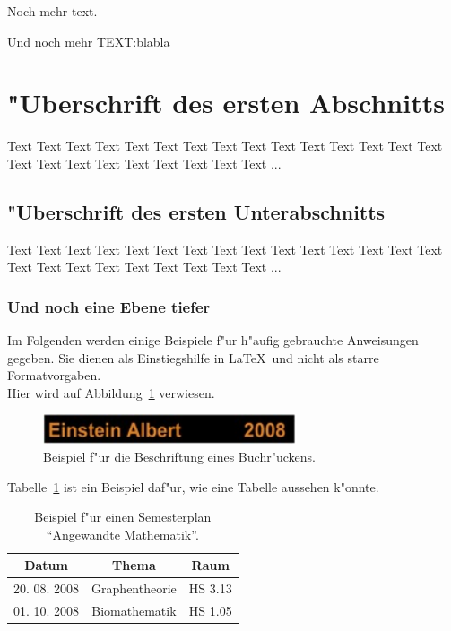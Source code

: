 \documentclass[a4paper,bibtotoc,oneside]{scrbook}
\begin{document}
Noch mehr text.

Und noch mehr TEXT:blabla

\section[Erster Abschnitt]{"Uberschrift des ersten Abschnitts}

Text Text Text Text Text Text Text Text Text Text Text Text Text Text Text Text Text Text Text Text Text Text Text Text ...

\subsection[Erster Unterabschnitt]{"Uberschrift des ersten Unterabschnitts}

Text Text Text Text Text Text Text Text Text Text Text Text Text Text Text Text Text Text Text Text Text Text Text Text ...

\subsubsection[Erster Unter-Unterabschnitt]{Und noch eine Ebene tiefer} 

Im Folgenden werden einige Beispiele f"ur h"aufig gebrauchte Anweisungen gegeben. Sie dienen als Einstiegshilfe in \LaTeX\ und 
nicht als starre Formatvorgaben.  
\\[2\baselineskip]
Hier wird auf Abbildung~\ref{Abb1} verwiesen. 
\begin{figure}[htbp]
\centering
\includegraphics[width=75mm]{Buchruecken}
\caption[Beschriftung eines Buchr"uckens.]{Beispiel f"ur die Beschriftung eines Buchr"uckens.}\label{Abb1}
\end{figure}
Tabelle~\ref{Tab1} ist ein Beispiel daf"ur, wie eine Tabelle aussehen k"onnte.
\begin{table}[htbp]
\centering
\begin{tabular}{ | c | c | c | }\hline
{\bf Datum} & {\bf Thema} & {\bf Raum}\\ \hline
\hline
20. 08. 2008 & Graphentheorie & HS 3.13\\ \hline
01. 10. 2008 & Biomathematik & HS 1.05\\ \hline
\end{tabular}
\caption[Semesterplan "`Angewandte Mathematik"'.]{Beispiel f"ur einen Semesterplan "`Angewandte Mathematik"'.}\label{Tab1}
\end{table}
\end{document}
